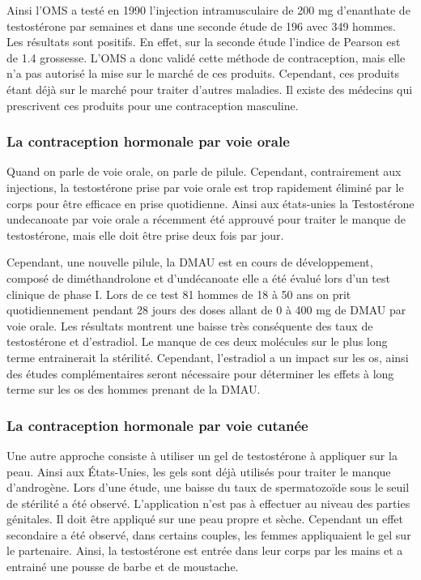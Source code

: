 \documentclass[12pt,a4paper]{report}
\begin{document}
Ainsi l'OMS a testé en 1990 l'injection intramusculaire de 200 mg d'enanthate de testostérone par semaines et dans une seconde étude de 196 avec 349 hommes. Les résultats sont positifs. En effet, sur la seconde étude l'indice de Pearson est de 1.4 grossesse. \cite{guerinContraceptionMasculineHormonale1996}
L'OMS a donc validé cette méthode de contraception, mais elle n'a pas autorisé la mise sur le marché de ces produits. Cependant, ces produits étant déjà sur le marché pour traiter d'autres maladies. \cite{anne-sophiedelcourHommeSousPilule} Il existe des médecins qui prescrivent ces produits pour une contraception masculine. \cite{guillaumedaudinContraceptesEnqueteDernier2022}

\subsubsection{La contraception hormonale par voie orale}

Quand on parle de voie orale, on parle de pilule.
Cependant, contrairement aux injections, la testostérone prise par voie orale est trop rapidement éliminé par le corps pour être efficace en prise quotidienne.
Ainsi aux états-unies la Testostérone undecanoate par voie orale a récemment été approuvé pour traiter le manque de testostérone, mais elle doit être prise deux fois par jour. \cite{longUpdateNovelHormonal2021}

Cependant, une nouvelle pilule, la DMAU est en cours de développement, composé de diméthandrolone et d'undécanoate \cite{medisitePiluleContraceptivePour} elle a été évalué lors d'un test clinique de phase I.
Lors de ce test 81 hommes de 18 à 50 ans on prit quotidiennement pendant 28 jours des doses allant de 0 à 400 mg de DMAU par voie orale. 
Les résultats montrent une baisse très conséquente des taux de testostérone et d'estradiol. Le manque de ces deux molécules sur le plus long terme entrainerait la stérilité.
Cependant, l'estradiol a un impact sur les os, ainsi des études complémentaires seront nécessaire pour déterminer les effets à long terme sur les os des hommes prenant de la DMAU.  \cites{longUpdateNovelHormonal2021}{thirumalaiDimethandroloneUndecanoateNovel2020}

\subsubsection{La contraception hormonale par voie cutanée}

Une autre approche consiste à utiliser un gel de testostérone à appliquer sur la peau. Ainsi aux États-Unies, les gels sont déjà utilisés pour traiter le manque d'androgène. 
Lors d'une étude, une baisse du taux de spermatozoïde sous le seuil de stérilité a été observé. \cite{longUpdateNovelHormonal2021}
L'application n'est pas à effectuer au niveau des parties génitales. Il doit être appliqué sur une peau propre et sèche. \cite{NoticePatientANDROGEL}
Cependant un effet secondaire a été observé, dans certains couples, les femmes appliquaient le gel sur le partenaire. Ainsi, la testostérone est entrée dans leur corps par les mains et a entrainé une pousse de barbe et de moustache. \cite{leblobContraceptionMasculineOu2021}
\end{document}
